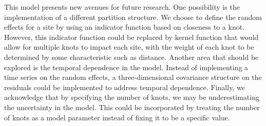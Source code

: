 This model presents new avenues for future research.
One possibility is the implementation of a different partition structure.
We choose to define the random effects for a site by using an indicator function based on closeness to a knot.
However, this indicator function could be replaced by kernel function that would allow for multiple knots to impact each site, with the weight of each knot to be determined by some characteristic such as distance.
Another area that should be explored is the temporal dependence in the model.
Instead of implementing a time series on the random effects, a three-dimensional covariance structure on the residuals could be implemented to address temporal dependence.
Finally, we acknowledge that by specifying the number of knots, we may be underestimating the uncertainty in the model.
This could be incorporated by treating the number of knots as a model parameter instead of fixing it to be a specific value.
